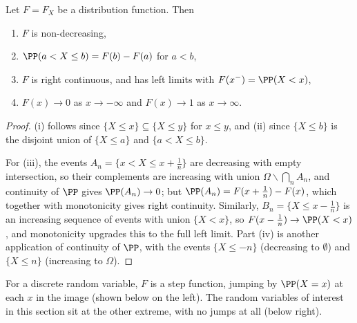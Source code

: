 \begin{proposition}
	Let $F = F_X$ be a distribution function. Then
	\begin{enumerate}[label=(\roman*)]
		\item $F$ is non-decreasing,
		\item $\PP(a < X \leq b) = F(b) - F(a)$ for $a < b$,
		\item $F$ is right continuous, and has left limits with $F(x^-) = \PP(X < x)$,
		\item $F(x) \rightarrow 0$ as $x \rightarrow -\infty$ and $F(x) \rightarrow 1$ as $x \rightarrow \infty$.
	\end{enumerate}
\end{proposition}
\begin{proof}
	(i) follows since $\{X \leq x\} \subseteq \{X \leq y\}$ for $x \leq y$, and (ii) since $\{X \leq b\}$ is the disjoint union of $\{X \leq a\}$ and $\{a < X \leq b\}$.

	For (iii), the events $A_n = \{x < X \leq x + \frac{1}{n}\}$ are decreasing with empty intersection, so their complements are increasing with union $\Omega \backslash \bigcap_n A_n$, and continuity of $\PP$ gives $\PP(A_n) \rightarrow 0$; but $\PP(A_n) = F(x + \frac1n) - F(x)$, which together with monotonicity gives right continuity. Similarly, $B_n = \{X \leq x - \frac1n\}$ is an increasing sequence of events with union $\{X < x\}$, so $F(x - \frac1n) \rightarrow \PP(X < x)$, and monotonicity upgrades this to the full left limit. Part (iv) is another application of continuity of $\PP$, with the events $\{X \leq -n\}$ (decreasing to $\emptyset$) and $\{X \leq n\}$ (increasing to $\Omega$).
\end{proof}

For a discrete random variable, $F$ is a step function, jumping by $\PP(X = x)$ at each $x$ in the image (shown below on the left). The random variables of interest in this section sit at the other extreme, with no jumps at all (below right).

\begin{center}
\qquad
{}
\end{center}

